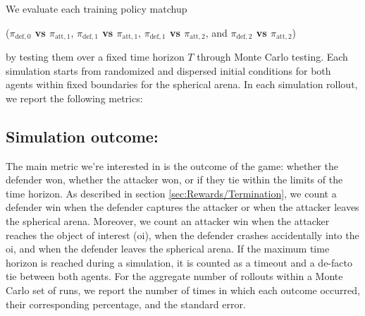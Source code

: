 We evaluate each training policy matchup 

({\boldmath\textbf{$\pi_{\mathrm{def},0}$ vs $\pi_{\mathrm{att},1}$}}, {\boldmath\textbf{$\pi_{\mathrm{def},1}$ vs $\pi_{\mathrm{att},1}$}}, {\boldmath\textbf{$\pi_{\mathrm{def},1}$ vs $\pi_{\mathrm{att},2}$}}, and {\boldmath\textbf{$\pi_{\mathrm{def},2}$ vs $\pi_{\mathrm{att},2}$}})


by testing them over a fixed time horizon \(T\) through Monte Carlo testing. Each simulation starts from randomized and dispersed initial conditions for both agents within fixed boundaries for the spherical arena. In each simulation rollout, we report the following metrics:


\subsection*{Simulation outcome:}

The main metric we're interested in is the outcome of the game: whether the defender won, whether the attacker won, or if they tie within the limits of the time horizon. As described in section \ref{sec:Rewards/Termination}, we count a defender win when the defender captures the attacker or when the attacker leaves the spherical arena. Moreover, we count an attacker win when the attacker reaches the object of interest (\acs{oi}), when the defender crashes accidentally into the \acs{oi}, and when the defender leaves the spherical arena. If the maximum time horizon is reached during a simulation, it is counted as a timeout and a de-facto tie between both agents. For the aggregate number of rollouts within a Monte Carlo set of runs, we report the number of times in which each outcome occurred, their corresponding percentage, and the standard error.





